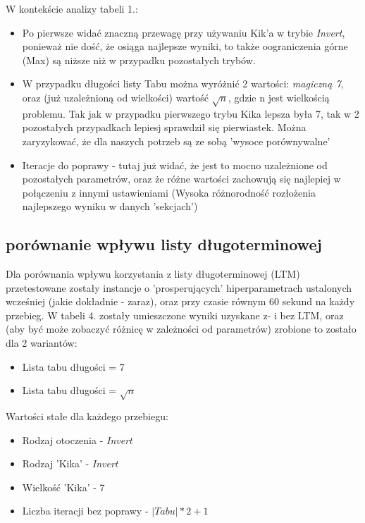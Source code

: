 \documentclass{article}
\begin{document}
W kontekście analizy tabeli 1.:
\begin{itemize}
	\item Po pierwsze widać znaczną przewagę przy używaniu Kik'a w trybie \textit{Invert}, ponieważ nie dość, że osiąga najlepsze wyniki, to także oograniczenia górne (Max) są niższe niż w przypadku pozostałych trybów.
	\item W przypadku długości listy Tabu można wyróżnić 2 wartości: \textit{magiczną 7}, oraz (już uzależnioną od wielkości) wartość $\sqrt{n}$, gdzie n jest wielkością problemu. Tak jak w przypadku pierwszego trybu Kika lepsza była 7, tak w 2 pozostałych przypadkach lepiesj sprawdził się pierwiastek. Można zaryzykować, że dla naszych potrzeb są ze sobą 'wysoce porównywalne'
	\item Iteracje do poprawy - tutaj już widać, że jest to mocno uzależnione od pozostałych parametrów, oraz że różne wartości zachowują się najlepiej w połączeniu z innymi ustawieniami (Wysoka różnorodność rozłożenia najlepszego wyniku w danych 'sekcjach')
\end{itemize}

\newpage
\subsection{porównanie wpływu listy długoterminowej}

Dla porównania wpływu korzystania z listy długoterminowej (LTM) przetestowane zostały instancje o 'prosperujących' hiperparametrach ustalonych wcześniej (jakie dokładnie - zaraz), oraz przy czasie równym 60 sekund na każdy przebieg. W tabeli 4. zostały umieszczone wyniki uzyskane z- i bez LTM, oraz (aby być może zobaczyć różnicę w zależności od parametrów) zrobione to zostało dla 2 wariantów:
\begin{itemize}
	\item Lista tabu długości = 7
	\item Lista tabu długości = $\sqrt{n}$
\end{itemize}
Wartości stałe dla każdego przebiegu:
\begin{itemize}
	\item Rodzaj otoczenia - \textit{Invert}
	\item Rodzaj 'Kika' - \textit{Invert}
	\item Wielkość 'Kika' - 7
	\item Liczba iteracji bez poprawy - $|Tabu|*2 + 1$
\end{itemize}
\end{document}

